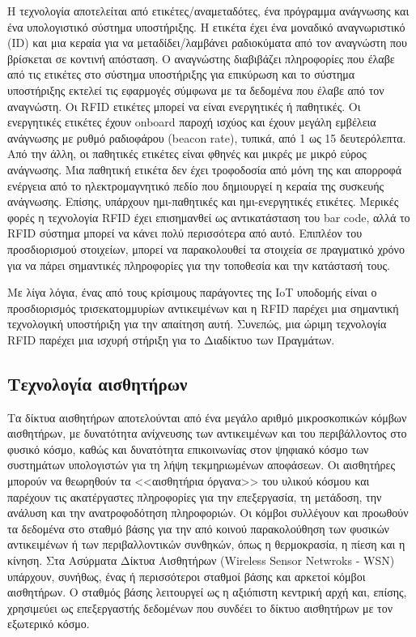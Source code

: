 \documentclass[12pt, a4paper, oneside]{report}
\begin{document}
Η τεχνολογία αποτελείται από ετικέτες\slash αναμεταδότες, ένα πρόγραμμα ανάγνωσης και ένα υπολογιστικό σύστημα υποστήριξης. Η ετικέτα έχει ένα μοναδικό αναγνωριστικό (ID) και μια κεραία για να μεταδίδει\slash λαμβάνει ραδιοκύματα από τον αναγνώστη που βρίσκεται σε κοντινή απόσταση. Ο αναγνώστης διαβιβάζει πληροφορίες που έλαβε από τις ετικέτες στο σύστημα υποστήριξης για επικύρωση και το σύστημα υποστήριξης εκτελεί τις εφαρμογές σύμφωνα με τα δεδομένα που έλαβε από τον αναγνώστη. Οι RFID ετικέτες μπορεί να είναι ενεργητικές ή παθητικές. Οι ενεργητικές ετικέτες έχουν onboard παροχή ισχύος και έχουν μεγάλη εμβέλεια ανάγνωσης με ρυθμό ραδιοφάρου (beacon rate), τυπικά, από 1 ως 15 δευτερόλεπτα. Από την άλλη, οι παθητικές ετικέτες είναι φθηνές και μικρές με μικρό εύρος ανάγνωσης. Μια παθητική ετικέτα δεν έχει τροφοδοσία από μόνη της και απορροφά ενέργεια από το ηλεκτρομαγνητικό πεδίο που δημιουργεί η κεραία της συσκευής ανάγνωσης. Επίσης, υπάρχουν ημι-παθητικές και ημι-ενεργητικές ετικέτες. Μερικές φορές η τεχνολογία RFID έχει επισημανθεί ως αντικατάσταση του bar code, αλλά το RFID σύστημα μπορεί να κάνει πολύ περισσότερα από αυτό. Επιπλέον του προσδιορισμού στοιχείων, μπορεί να παρακολουθεί τα στοιχεία σε πραγματικό χρόνο για να πάρει σημαντικές πληροφορίες για την τοποθεσία και την κατάστασή τους.

Με λίγα λόγια, ένας από τους κρίσιμους παράγοντες της IoT υποδομής είναι ο προσδιορισμός τρισεκατομμυρίων αντικειμένων και η RFID παρέχει μια σημαντική τεχνολογική υποστήριξη για την απαίτηση αυτή. Συνεπώς, μια ώριμη τεχνολογία RFID παρέχει μια ισχυρή στήριξη για το Διαδίκτυο των Πραγμάτων.

\subsection{Τεχνολογία αισθητήρων}

Τα δίκτυα αισθητήρων αποτελούνται από ένα μεγάλο αριθμό μικροσκοπικών κόμβων αισθητήρων, με δυνατότητα ανίχνευσης των αντικειμένων και του περιβάλλοντος στο φυσικό κόσμο, καθώς και δυνατότητα επικοινωνίας στον ψηφιακό κόσμο των συστημάτων υπολογιστών για τη λήψη τεκμηριωμένων αποφάσεων. Οι αισθητήρες μπορούν να θεωρηθούν τα <<αισθητήρια όργανα>> του υλικού κόσμου και παρέχουν τις ακατέργαστες πληροφορίες για την επεξεργασία, τη μετάδοση, την ανάλυση και την ανατροφοδότηση πληροφοριών. Οι κόμβοι συλλέγουν και προωθούν τα δεδομένα στο σταθμό βάσης για την από κοινού παρακολούθηση των φυσικών αντικειμένων ή των περιβαλλοντικών συνθηκών, όπως η θερμοκρασία, η πίεση και η κίνηση. Στα Ασύρματα Δίκτυα Αισθητήρων (Wireless Sensor Netwroks - WSN) υπάρχουν, συνήθως, ένας ή περισσότεροι σταθμοί βάσης και αρκετοί κόμβοι αισθητήρων. Ο σταθμός βάσης λειτουργεί ως η αξιόπιστη κεντρική αρχή και, επίσης, χρησιμεύει ως επεξεργαστής δεδομένων που συνδέει το δίκτυο αισθητήρων με τον εξωτερικό κόσμο.
\end{document}

